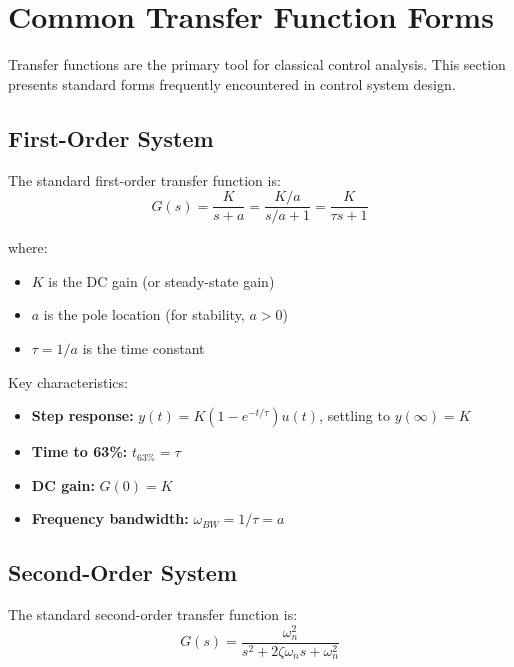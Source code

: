 \section{Common Transfer Function Forms}
\label{sec:transfer_functions}

Transfer functions are the primary tool for classical control analysis. This section presents standard forms frequently encountered in control system design.

\subsection{First-Order System}
\label{subsec:first_order}

The standard first-order transfer function is:
\begin{equation}
    G(s) = \frac{K}{s + a} = \frac{K/a}{s/a + 1} = \frac{K}{\tau s + 1}
\end{equation}

\noindent where:
\begin{itemize}
    \item $K$ is the DC gain (or steady-state gain)
    \item $a$ is the pole location (for stability, $a > 0$)
    \item $\tau = 1/a$ is the time constant
\end{itemize}

Key characteristics:
\begin{itemize}
    \item \textbf{Step response:} $y(t) = K(1 - e^{-t/\tau}) u(t)$, settling to $y(\infty) = K$
    \item \textbf{Time to 63\%:} $t_{63\%} = \tau$
    \item \textbf{DC gain:} $G(0) = K$
    \item \textbf{Frequency bandwidth:} $\omega_{BW} = 1/\tau = a$
\end{itemize}

\subsection{Second-Order System}
\label{subsec:second_order}

The standard second-order transfer function is:
\begin{equation}
    G(s) = \frac{\omega_n^2}{s^2 + 2\zeta\omega_n s + \omega_n^2}
\end{equation}

